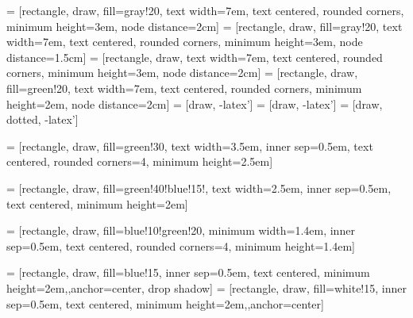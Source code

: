  = [rectangle, draw, fill=gray!20,
    text width=7em, text centered, rounded corners, minimum height=3em, node distance=2cm]
 = [rectangle, draw, fill=gray!20,
    text width=7em, text centered, rounded corners, minimum height=3em, node distance=1.5cm]
 = [rectangle, draw,
    text width=7em, text centered, rounded corners, minimum height=3em, node distance=2cm]
 = [rectangle, draw, fill=green!20,
    text width=7em, text centered, rounded corners, minimum height=2em, node distance=2cm]
 = [draw, -latex']
 = [draw, -latex']
 = [draw, dotted, -latex']

 = [rectangle, draw, fill=green!30, text width=3.5em, inner sep=0.5em, text centered, rounded corners=4, minimum height=2.5em]

 = [rectangle, draw, fill=green!40!blue!15!, text width=2.5em, inner sep=0.5em, text centered, minimum height=2em]

 = [rectangle, draw, fill=blue!10!green!20, minimum width=1.4em, inner sep=0.5em, text centered, rounded corners=4, minimum height=1.4em]

 = [rectangle, draw, fill=blue!15, inner sep=0.5em, text centered,
 minimum height=2em,,anchor=center, drop shadow]
 = [rectangle, draw, fill=white!15, inner sep=0.5em, text centered,
 minimum height=2em,,anchor=center]

